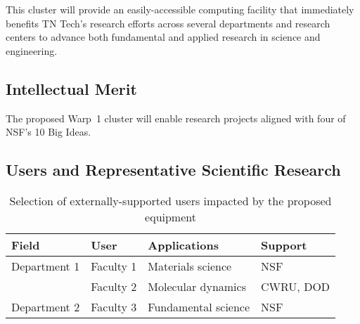 \documentclass[12pt]{nsf-proposal}
\begin{document}
This cluster will provide an easily-accessible computing facility that immediately benefits TN Tech's research efforts across several departments and research centers to advance both fundamental and applied research in science and engineering.

\subsection{Intellectual Merit}

The proposed Warp~1 cluster will enable research projects aligned with four of NSF's 10 Big Ideas.

\subsection{Users and Representative Scientific Research}

\begin{table}
\centering
\caption{\label{tab:users} Selection of externally-supported users impacted by the proposed equipment}
\begin{tabular}{P{1.7in}P{1.5in}P{1.6in}P{1.25in}} \toprule
{\bfseries Field} & {\bfseries User} & {\bfseries Applications} & {\bfseries Support} \\ \midrule
Department 1 & Faculty 1 & Materials science & NSF \\
             & Faculty 2 & Molecular dynamics & CWRU, DOD \\ \addlinespace

Department 2 & Faculty 3 & Fundamental science & NSF \\ \bottomrule
\end{tabular}
\end{table}
\end{document}

